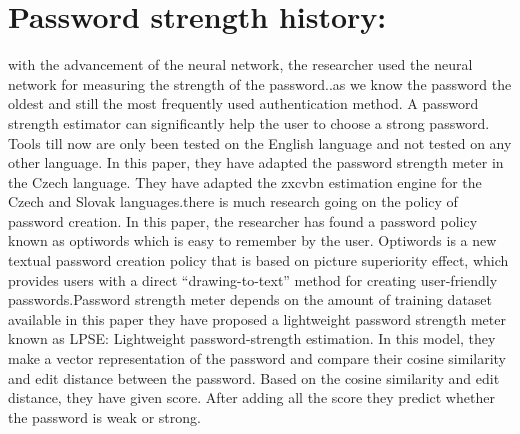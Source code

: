\documentclass[runningheads]{llncs}
\begin{document}
\section{Password strength history:}
with the advancement of the neural network, the researcher used the neural network for measuring the strength of the password.\cite{197243}.as we know the password the oldest and still the most frequently used authentication method. A password strength estimator can significantly help the user to choose a strong password. Tools till now are only been tested on the English language and not tested on any other language. In this paper,\cite{article} they have adapted the password strength meter in the Czech language. They have adapted the zxcvbn estimation engine for the Czech and Slovak languages.there is much research going on the policy of password creation. In this paper, \cite{GUO2019423}the researcher has found a password policy known as optiwords which is easy to remember by the user.  Optiwords is a new textual password creation policy that is based on picture superiority effect, which provides users with a direct “drawing-to-text” method for creating user-friendly passwords.Password strength meter depends on the amount of training dataset available in this paper \cite{Guo2018LPSELP} they have proposed a lightweight password strength meter known as LPSE: Lightweight password-strength
estimation. In this model, they make a vector representation of the password and compare their cosine similarity and edit distance between the password. Based on the cosine similarity and edit distance, they have given score. After adding all the score they predict whether the password is weak or strong.
\end{document}

